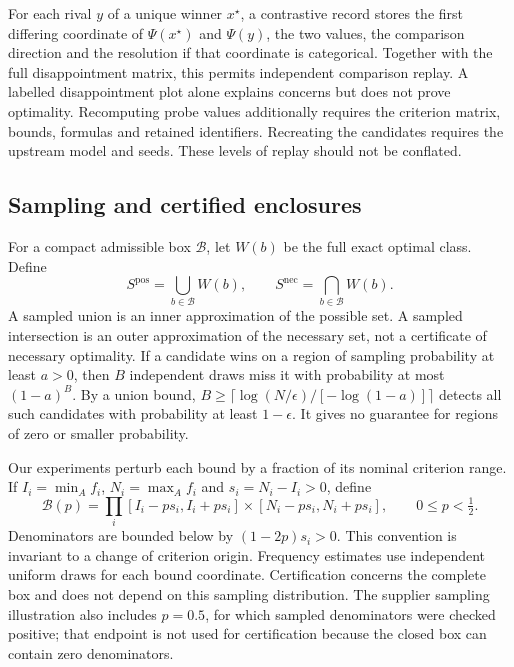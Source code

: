 For each rival $y$ of a unique winner $x^\star$, a contrastive record stores the first differing coordinate of $\Psi(x^\star)$ and $\Psi(y)$, the two values, the comparison direction and the resolution if that coordinate is categorical. Together with the full disappointment matrix, this permits independent comparison replay. A labelled disappointment plot alone explains concerns but does not prove optimality. Recomputing probe values additionally requires the criterion matrix, bounds, formulas and retained identifiers. Recreating the candidates requires the upstream model and seeds. These levels of replay should not be conflated.

\subsection{Sampling and certified enclosures}
For a compact admissible box $\mathcal B$, let $W(b)$ be the full exact optimal class. Define
\begin{equation}
S^{\mathrm{pos}}=\bigcup_{b\in\mathcal B}W(b),\qquad S^{\mathrm{nec}}=\bigcap_{b\in\mathcal B}W(b).
\label{eq:interval}
\end{equation}
A sampled union is an inner approximation of the possible set. A sampled intersection is an outer approximation of the necessary set, not a certificate of necessary optimality. If a candidate wins on a region of sampling probability at least $a>0$, then $B$ independent draws miss it with probability at most $(1-a)^B$. By a union bound, $B\ge\lceil\log(N/\epsilon)/[-\log(1-a)]\rceil$ detects all such candidates with probability at least $1-\epsilon$. It gives no guarantee for regions of zero or smaller probability.

Our experiments perturb each bound by a fraction of its nominal criterion range. If $I_i=\min_Af_i$, $N_i=\max_Af_i$ and $s_i=N_i-I_i>0$, define
\begin{equation}
\mathcal B(p)=\prod_i[I_i-ps_i,I_i+ps_i]\times[N_i-ps_i,N_i+ps_i],\qquad 0\le p<\tfrac12.
\label{eq:box}
\end{equation}
Denominators are bounded below by $(1-2p)s_i>0$. This convention is invariant to a change of criterion origin. Frequency estimates use independent uniform draws for each bound coordinate. Certification concerns the complete box and does not depend on this sampling distribution. The supplier sampling illustration also includes $p=0.5$, for which sampled denominators were checked positive; that endpoint is not used for certification because the closed box can contain zero denominators.

